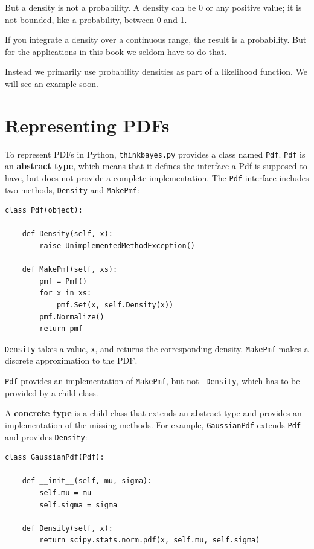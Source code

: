 \documentclass[12pt]{book}
\begin{document}
But a density is not a probability.  A density can be 0 or any positive
value; it is not bounded, like a probability, between 0 and 1.

If you integrate a density
over a continuous range, the result is a probability.  But 
for the applications in this book we seldom have to do that.

Instead we primarily use probability densities as part
of a likelihood function.  We will see an example soon.


\section{Representing PDFs}

To represent PDFs in Python,
{\tt thinkbayes.py} provides a class named {\tt Pdf}.
{\tt Pdf} is an {\bf abstract type}, which means that it defines
the interface a Pdf is supposed to have, but does not provide
a complete implementation.  The {\tt Pdf} interface includes
two methods, {\tt Density} and {\tt MakePmf}:

\begin{verbatim}
class Pdf(object):

    def Density(self, x):
        raise UnimplementedMethodException()

    def MakePmf(self, xs):
        pmf = Pmf()
        for x in xs:
            pmf.Set(x, self.Density(x))
        pmf.Normalize()
        return pmf
\end{verbatim}

{\tt Density} takes a value, {\tt x}, and returns the corresponding
density.  {\tt MakePmf} makes a discrete approximation to the PDF.

{\tt Pdf} provides an implementation of {\tt MakePmf}, but not {\tt
  Density}, which has to be provided by a child class.
  

A {\bf concrete type} is a child class that extends an abstract type
and provides an implementation of the missing methods.
For example, {\tt GaussianPdf} extends {\tt Pdf} and provides
{\tt Density}:

\begin{verbatim}
class GaussianPdf(Pdf):

    def __init__(self, mu, sigma):
        self.mu = mu
        self.sigma = sigma
        
    def Density(self, x):
        return scipy.stats.norm.pdf(x, self.mu, self.sigma)
\end{verbatim}
\end{document}
